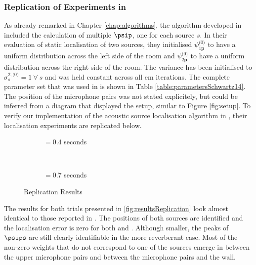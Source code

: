 \subsubsection{Replication of Experiments in \citeauthor{Schwartz2014} \citeyearpar{Schwartz2014}}
As already remarked in Chapter \ref{chap:algorithms}, the algorithm developed in \cite{Schwartz2014} included the calculation of multiple $\psip$, one for each source $s$. In their evaluation of static localisation of two sources, they initialised $\psi^{\text{(0)}}_{1\bm p} $ to have a uniform distribution across the left side of the room and $\psi^{\text{(0)}}_{2\bm p} $ to have a uniform distribution across the right side of the room. The variance has been initialised to $\sigma^{2, \text{(0)}}_s=1\ \forall\ s$ and was held constant across all \gls{em} iterations. The complete parameter set that was used in \cite{Schwartz2014} is shown in Table \ref{table:parametersSchwartz14}. The position of the microphone pairs was not stated explicitely, but could be inferred from a diagram that displayed the setup, similar to Figure \ref{fig:setup}. To verify our implementation of the acoustic source localisation algorithm in \cite{Schwartz2014}, their localisation experiments are replicated below.



\newpage
\begin{figure}[!p]
	\begin{subfigure}{\textwidth}
		\iftoggle{quick}{%
			\texttt{[image: plots/schwartz2014/s=2-sloc=schwartz2014-T60=0.4-prior=schwartz2014-results-sc]}
		}{%
			\setlength{\figurewidth}{\textwidth}
			
		}
		\caption{\Tsixty$=0.4$ seconds}
	\end{subfigure}\\[24pt]
	\begin{subfigure}{\textwidth}
		\iftoggle{quick}{%
			\texttt{[image: plots/schwartz2014/s=2-sloc=schwartz2014-T60=0.7-prior=schwartz2014-results-sc]}
		}{%
			\setlength{\figurewidth}{\textwidth}
			
		}
		\caption{\Tsixty$=0.7$ seconds}
	\end{subfigure}
	\caption{Replication Results}
	\label{fig:resultsReplication}
\end{figure}

The results for both trials presented in \autoref{fig:resultsReplication} look almost identical to those reported in \cite{Schwartz2014}. The positions of both sources are identified and the localisation error is zero for both  and . Although smaller, the peaks of $\psips$ are still clearly identifiable in the more reverberant case. Most of the non-zero weights that do not correspond to one of the sources emerge in between the upper microphone pairs and between the microphone pairs and the wall. 

